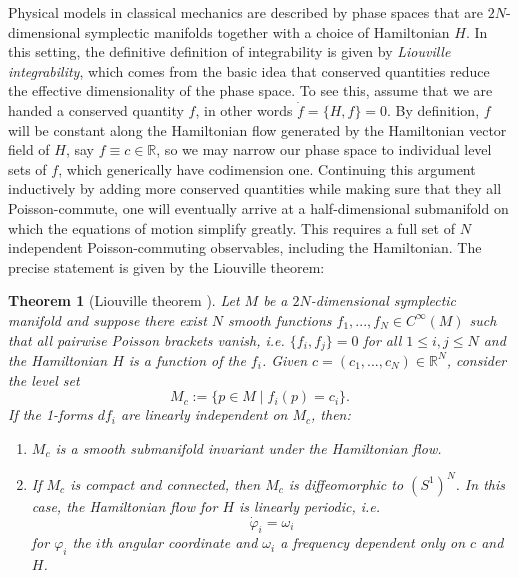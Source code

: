 \documentclass[11pt]{report}
\newtheorem{theorem}{Theorem}[section]
\theoremstyle{definition}
\theoremstyle{remark}
\theoremstyle{remark}
\newcommand{\R}{\mathbb{R}}
\begin{document}
Physical models in classical mechanics are described by phase spaces that are $2N$-dimensional symplectic manifolds together with a choice of Hamiltonian $H$. In this setting, the definitive definition of integrability is given by \emph{Liouville integrability}, which comes from the basic idea that conserved quantities reduce the effective dimensionality of the phase space. To see this, assume that we are handed a conserved quantity $f$, in other words $\dot f = \{ H, f \} = 0$. By definition, $f$ will be constant along the Hamiltonian flow generated by the Hamiltonian vector field of $H$, say $f \equiv c \in \R$, so we may narrow our phase space to individual level sets of $f$, which generically have codimension one. Continuing this argument inductively by adding more conserved quantities while making sure that they all Poisson-commute, one will eventually arrive at a half-dimensional submanifold on which the equations of motion simplify greatly. This requires a full set of $N$ independent Poisson-commuting observables, including the Hamiltonian. The precise statement is given by the Liouville theorem:

\begin{theorem}[Liouville theorem \cite{book:arnold}] 
Let $M$ be a $2N$-dimensional symplectic manifold and suppose there exist $N$ smooth functions $f_1,...,f_N \in C^\infty(M)$ such that all pairwise Poisson brackets vanish, \emph{i.e.} $\{ f_i,f_j \} = 0$ for all $1 \leq i,j \leq N$ and the Hamiltonian $H$ is a function of the $f_i$. Given $c = (c_1,...,c_N) \in \R^N$, consider the level set
\begin{equation*}
M_c := \{ p \in M \mid f_i(p) = c_i \}.
\end{equation*}
If the 1-forms $df_i$ are linearly independent on $M_c$, then:
\begin{enumerate}[label=(\roman*)]
\item $M_c$ is a smooth submanifold invariant under the Hamiltonian flow.
\item If $M_c$ is compact and connected, then $M_c$ is diffeomorphic to $(S^1)^N$. In this case, the Hamiltonian flow for $H$ is linearly periodic, \emph{i.e.}
\begin{equation*}
\dot \varphi_i = \omega_i
\end{equation*}
for $\varphi_i$ the $i$th angular coordinate and $\omega_i$ a frequency dependent only on $c$ and $H$.
\end{enumerate}
\end{theorem}
\end{document}
